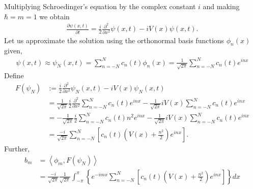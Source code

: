 \begin{questions}
\begin{solution}
Multiplying Schroedinger's equation by the complex constant $i$ and making $\hbar = m = 1$ we obtain
\begin{align*}
\frac{\partial\psi(x, t)}{\partial t}  = \frac{i}{2}\frac{\partial^2}{\partial x^2}\psi(x,t) - iV (x)\psi(x,t).
\end{align*}
Let us approximate the solution using the orthonormal basis functions $\phi_n(x)$ given,
\begin{align*}
\psi(x,t)\approx\psi_N(x,t) = \sum_{n=-N}^Nc_n(t)\phi_n(x) = \frac{1}{\sqrt{2\pi}}\sum_{n=-N}^Nc_n(t)e^{inx}
\end{align*}
Define 
\begin{align*}
F(\psi_N)&:= \frac{i}{2}\frac{\partial^2}{\partial x^2}\psi_N(x,t) - iV (x)\psi_N(x,t)\\
&= \frac{1}{\sqrt{2\pi}}\frac{i}{2}\frac{\partial^2}{\partial x^2}\sum_{n=-N}^Nc_n(t)e^{inx} - \frac{1}{\sqrt{2\pi}}iV (x)\sum_{n=-N}^Nc_n(t)e^{inx}\\
&= -\frac{1}{\sqrt{2\pi}}\frac{i}{2}\sum_{n=-N}^Nc_n(t)n^2e^{inx} - \frac{1}{\sqrt{2\pi}}iV (x)\sum_{n=-N}^Nc_n(t)e^{inx}\\
&= \frac{-i}{\sqrt{2\pi}}\sum_{n=-N}^N\left[c_n(t)\left(V (x) + \frac{n^2}{2}\right)e^{inx}\right].
\end{align*}
Further, 
\begin{align*}
b_m &= \left\langle \phi_m,F(\psi_N)\right\rangle\\
&= \frac{-i}{\sqrt{2\pi}}\frac{1}{\sqrt{2\pi}}\int_{-\pi}^{\pi}\left\lbrace e^{-imx}\sum_{n=-N}^N\left[c_n(t)\left(V (x) + \frac{n^2}{2}\right)e^{inx}\right]\right\rbrace dx\\

\end{align*}
\end{solution}
\end{questions}
